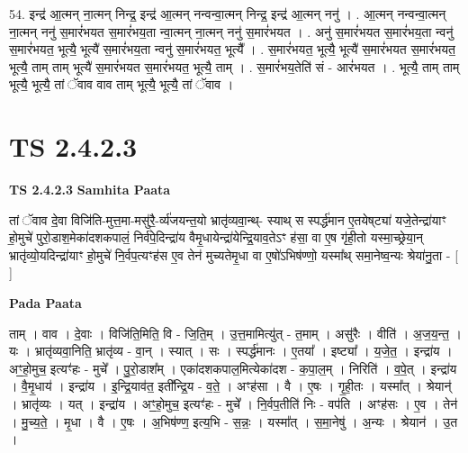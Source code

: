 \documentclass[17pt]{extarticle}
\begin{document}
54. इन्द्र॑ आ॒त्मन् ना॒त्मन् निन्द्र॒ इन्द्र॑ आ॒त्मन् नन्वन्वा॒त्मन् निन्द्र॒ इन्द्र॑ आ॒त्मन् ननु॑ । . आ॒त्मन् नन्वन्वा॒त्मन् ना॒त्मन् ननु॑ स॒मारं॑भयत स॒मारं॑भय॒ता न्वा॒त्मन् ना॒त्मन् ननु॑ स॒मारं॑भयत । . अनु॑ स॒मारं॑भयत स॒मारं॑भय॒ता न्वनु॑ स॒मारं॑भयत॒ भूत्यै॒ भूत्यै॑ स॒मारं॑भय॒ता न्वनु॑ स॒मारं॑भयत॒ भूत्यै᳚ । . स॒मारं॑भयत॒ भूत्यै॒ भूत्यै॑ स॒मारं॑भयत स॒मारं॑भयत॒ भूत्यै॒ ताम् ताम् भूत्यै॑ स॒मारं॑भयत स॒मारं॑भयत॒ भूत्यै॒ ताम् । . स॒मारं॑भय॒तेति॑ सं - आरं॑भयत । . भूत्यै॒ ताम् ताम् भूत्यै॒ भूत्यै॒ तां ॅवाव वाव ताम् भूत्यै॒ भूत्यै॒ तां ॅवाव । \newline
\pagebreak
{}
\section*{ TS 2.4.2.3 }

\textbf{TS 2.4.2.3 } \newline
\textbf{Samhita Paata} \newline

तां ॅवाव दे॒वा विजि॑ति-मुत्त॒मा-मसु॑रै॒-र्व्य॑जयन्त॒यो भ्रातृ॑व्यवा॒न्थ्- स्याथ् स स्पर्द्ध॑मान ए॒तयेष्‌ट्या॑ यजे॒तेन्द्रा॑याꣳ हो॒मुचे॑ पुरो॒डाश॒मेका॑दशकपालं॒ निर्व॑पे॒दिन्द्रा॑य वैमृ॒धायेन्द्रा॑येन्द्रि॒याव॒तेऽꣳ ह॑सा॒ वा ए॒ष गृ॑ही॒तो यस्मा॒च्छ्रेया॒न् भ्रातृ॑व्यो॒यदिन्द्रा॑याꣳ हो॒मुचे॑ नि॒र्वप॒त्यꣳह॑स ए॒व तेन॑ मुच्यतेमृ॒धा वा ए॒षो॑ऽभिष॑ण्णो॒ यस्मा᳚थ् समा॒नेष्व॒न्यः श्रेया॑नु॒ता - [  ] \newline

\textbf{Pada Paata} \newline

ताम् । वाव । दे॒वाः । विजि॑ति॒मिति॒ वि - जि॒ति॒म् । उ॒त्त॒मामित्यु॑त् - त॒माम् । असु॑रैः । वीति॑ । अ॒ज॒य॒न्त॒ । यः । भ्रातृ॑व्यवा॒निति॒ भ्रातृ॑व्य - वा॒न् । स्यात् । सः । स्पर्द्ध॑मानः । ए॒तया᳚ । इष्ट्या᳚ । य॒जे॒त॒ । इन्द्रा॑य । अꣳ॒॒हो॒मुच॒ इत्यꣳ॑हः - मुचे᳚ । पु॒रो॒डाश᳚म् । एका॑दशकपाल॒मित्येका॑दश - क॒पा॒ल॒म् । निरिति॑ । व॒पे॒त् । इन्द्रा॑य । वै॒मृ॒धाय॑ । इन्द्रा॑य । इ॒न्द्रि॒याव॑त॒ इती᳚न्द्रि॒य - व॒ते॒ । अꣳह॑सा । वै । ए॒षः । गृ॒ही॒तः । यस्मा᳚त् । श्रेयान्॑ । भ्रातृ॑व्यः । यत् । इन्द्रा॑य । अꣳ॒॒हो॒मुच॒ इत्यꣳ॑हः - मुचे᳚ । नि॒र्वप॒तीति॑ निः - वप॑ति । अꣳह॑सः । ए॒व । तेन॑ । मु॒च्य॒ते॒ । मृ॒धा । वै । ए॒षः । अ॒भिष॑ण्ण॒ इत्य॒भि - स॒न्नः॒ । यस्मा᳚त् । स॒मा॒नेषु॑ । अ॒न्यः । श्रेयान॑ । उ॒त ।  \newline
\end{document}
